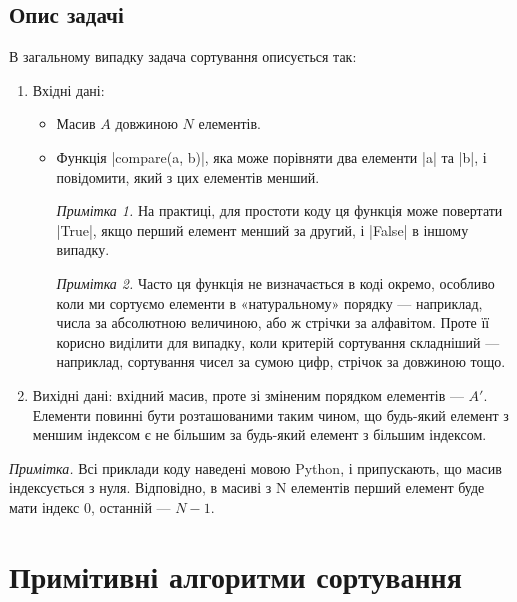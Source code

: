 \documentclass[12pt,a4paper]{report}
\begin{document}
\begin{minipage}{\linewidth}
\subsection*{Опис задачі}

В загальному випадку задача сортування описується так:

\begin{enumerate}
    \item Вхідні дані:
        \begin{itemize}
            \item Масив \(A\) довжиною \(N\) елементів.
            \item Функція |compare(a, b)|, яка може порівняти два елементи |a| та |b|, і повідомити, який з цих елементів менший.

                \emph{Примітка 1.} На практиці, для простоти коду ця функція може повертати |True|, якщо перший елемент менший за другий, і |False| в іншому випадку.

                

                \emph{Примітка 2.} Часто ця функція не визначається в коді окремо, особливо коли ми сортуємо елементи в «натуральному» порядку --- наприклад, числа за абсолютною величиною, або ж стрічки за алфавітом.
                Проте її корисно виділити для випадку, коли критерій сортування складніший --- наприклад, сортування чисел за сумою цифр, стрічок за довжиною тощо.

                
        \end{itemize}
    \item Вихідні дані: вхідний масив, проте зі зміненим порядком елементів --- \(A'\). Елементи повинні бути розташованими таким чином, що будь-який елемент з меншим індексом є не більшим за будь-який елемент з більшим індексом.
\end{enumerate}

\emph{Примітка.} Всі приклади коду наведені мовою Python, і припускають, що масив індексується з нуля. Відповідно, в масиві з N елементів перший елемент буде мати індекс \(0\), останній --- \(N - 1\).
\end{minipage}



\section{Примітивні алгоритми сортування}
\end{document}
